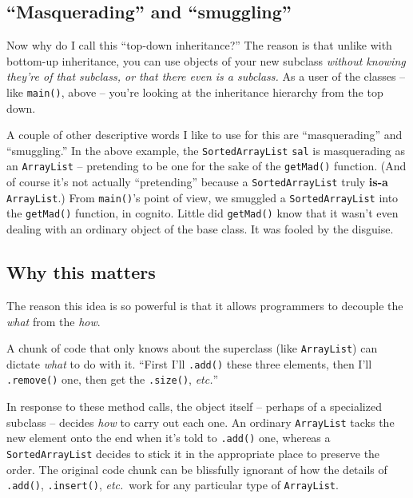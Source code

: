 \subsection{``Masquerading'' and ``smuggling''}

Now why do I call this ``top-down inheritance?'' The reason is that unlike with
bottom-up inheritance, you can use objects of your new subclass
\textit{without knowing they're of that subclass, or that there even is a
subclass.} As a user of the classes -- like \texttt{main()}, above -- you're
looking at the inheritance hierarchy from the top down.

A couple of other descriptive words I like to use for this are ``masquerading''
and ``smuggling.'' In the above example, the \texttt{SortedArrayList}
\texttt{sal} is masquerading as an \texttt{ArrayList} -- pretending to be one
for the sake of the \texttt{getMad()} function. (And of course it's not
actually ``pretending'' because a \texttt{SortedArrayList} truly
\mbox{\textbf{is-a}} \texttt{ArrayList}.) From \texttt{main()}'s point of
view, we smuggled a \texttt{SortedArrayList} into the \texttt{getMad()}
function, in cognito. Little did \texttt{getMad()} know that it wasn't even
dealing with an ordinary object of the base class. It was fooled by the
disguise.

\pagebreak
\subsection{Why this matters}

The reason this idea is so powerful is that it allows programmers to decouple
the \textit{what} from the \textit{how}.

A chunk of code that only knows about the superclass (like \texttt{ArrayList})
can dictate \textit{what} to do with it. ``First I'll \texttt{.add()} these
three elements, then I'll \texttt{.remove()} one, then get the
\texttt{.size()}, \textit{etc.}''

In response to these method calls, the object itself -- perhaps of a
specialized subclass -- decides \textit{how} to carry out each one. An
ordinary \texttt{ArrayList} tacks the new element onto the end when it's told
to \texttt{.add()} one, whereas a \texttt{SortedArrayList} decides to stick it
in the appropriate place to preserve the order. The original code chunk can be
blissfully ignorant of how the details of \texttt{.add()}, \texttt{.insert()},
\textit{etc.}~work for any particular type of \texttt{ArrayList}.

